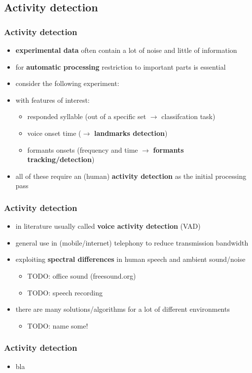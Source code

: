
\subsection{Activity detection}

\begin{frame} %
	\frametitle{Activity detection}
	\begin{itemize}
		\item \textbf{experimental data} often contain a lot of noise and little of information
		\item for \textbf{automatic processing} restriction to important parts is essential
		\item consider the following experiment:
			\begin{figure}
				\centering
				\begin{subfigure}[c]{0.8\linewidth}
				\end{subfigure}
			\end{figure}
		\item with features of interest:
			\begin{itemize}
				\item responded syllable (out of a specific set $\rightarrow$ classifcation task)
				\item voice onset time ($\rightarrow$ \textbf{landmarks detection})
				\item formants onsets (frequency and time $\rightarrow$ \textbf{formants tracking/detection})
			\end{itemize}
		\item all of these require an (human) \textbf{activity detection} as the initial processing pass
	\end{itemize}
\end{frame}

\begin{frame} %
	\frametitle{Activity detection}
	\begin{itemize}
		\item in literature usually called \textbf{voice activity detection} (VAD)
		\item general use in (mobile/internet) telephony to reduce transmission bandwidth
		\item exploiting \textbf{spectral differences} in human speech and ambient sound/noise
			\begin{itemize}
				\item TODO: office sound (freesound.org)
				\item TODO: speech recording
			\end{itemize}
		\item there are many solutions/algorithms for a lot of different environments
			\begin{itemize}
				\item TODO: name some!
			\end{itemize}
	\end{itemize}
\end{frame}

\begin{frame} %
	\frametitle{Activity detection}
	\begin{itemize}
		\item bla
	\end{itemize}
\end{frame}
